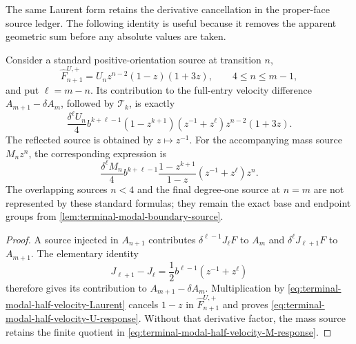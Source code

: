 The same Laurent form retains the derivative cancellation in the proper-face
source ledger.  The following identity is useful because it removes the
apparent geometric sum before any absolute values are taken.

\begin{lemma}
\label{lem:terminal-modal-half-velocity-moving-source}
Consider a standard positive-orientation source at transition $n$,
\[
 \widehat F_{n+1}^{U,+}=U_nz^{n-2}(1-z)(1+3z),
 \qquad4\le n\le m-1,
\]
and put $\ell=m-n$.  Its contribution to the full-entry velocity difference
$A_{m+1}-\delta A_m$, followed by $\mathcal T_k$, is exactly
\begin{equation}
 \frac{\delta^\ell U_n}{4}
 b^{k+\ell-1}(1-z^{k+1})(z^{-1}+z^\ell)
 z^{n-2}(1+3z).
 \label{eq:terminal-modal-half-velocity-U-response}
\end{equation}
The reflected source is obtained by $z\mapsto z^{-1}$.  For the accompanying
mass source $M_nz^n$, the corresponding expression is
\begin{equation}
 \frac{\delta^\ell M_n}{4}
 b^{k+\ell-1}\frac{1-z^{k+1}}{1-z}
 (z^{-1}+z^\ell)z^n.
 \label{eq:terminal-modal-half-velocity-M-response}
\end{equation}
The overlapping sources $n<4$ and the final degree-one source at $n=m$ are
not represented by these standard formulas; they remain the exact base and
endpoint groups from
\cref{lem:terminal-modal-boundary-source}.
\end{lemma}

\begin{proof}
A source injected in $A_{n+1}$ contributes
$\delta^{\ell-1}J_\ell F$ to $A_m$ and
$\delta^\ell J_{\ell+1}F$ to $A_{m+1}$.  The elementary identity
\begin{equation}
 J_{\ell+1}-J_\ell
 =\frac12b^{\ell-1}(z^{-1}+z^\ell)
 \label{eq:terminal-modal-entry-velocity-difference}
\end{equation}
therefore gives its contribution to $A_{m+1}-\delta A_m$.
Multiplication by \eqref{eq:terminal-modal-half-velocity-Laurent} cancels
$1-z$ in $\widehat F_{n+1}^{U,+}$ and proves
\eqref{eq:terminal-modal-half-velocity-U-response}.  Without that derivative
factor, the mass source retains the finite quotient in
\eqref{eq:terminal-modal-half-velocity-M-response}.
\end{proof}

